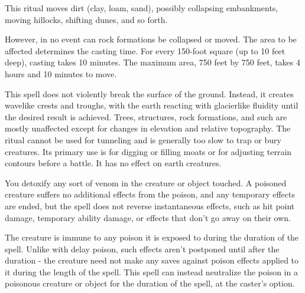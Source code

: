 \spelleffect This ritual moves dirt (clay, loam, sand), possibly collapsing embankments, moving hillocks, shifting dunes, and so forth.
\par However, in no event can rock formations be collapsed or moved. The area to be affected determines the casting time. For every 150-foot square (up to 10 feet deep), casting takes 10 minutes. The maximum area, 750 feet by 750 feet, takes 4 hours and 10 minutes to move.
\par This spell does not violently break the surface of the ground. Instead, it creates wavelike crests and troughs, with the earth reacting with glacierlike fluidity until the desired result is achieved. Trees, structures, rock formations, and such are mostly unaffected except for changes in elevation and relative topography.
\spellnotes The ritual cannot be used for tunneling and is generally too slow to trap or bury creatures. Its primary use is for digging or filling moats or for adjusting terrain contours before a battle. It has no effect on earth creatures.

\spelldur{\durext \dismissable}
\spelleffect You detoxify any sort of venom in the creature or object touched. A poisoned  creature suffers no additional effects from  the poison, and any temporary effects are ended, but the spell does not reverse  instantaneous effects, such as hit point  damage, temporary ability damage, or  effects that don't go away on their own.
\par The creature is immune to any poison it  is exposed to during the duration of the  spell. Unlike with delay poison, such effects aren't postponed until after the duration - the creature need not make any saves  against poison effects applied to it during  the length of the spell. This spell can instead neutralize the  poison in a poisonous creature or object  for the duration of the spell, at the caster's  option.

